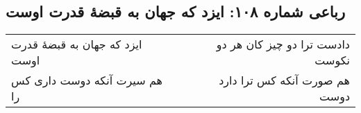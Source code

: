 \begin{center}
\section*{رباعی شماره ۱۰۸: ایزد که جهان به قبضهٔ قدرت اوست}
\label{sec:sh108}
\begin{longtable}{l p{0.5cm} r}
ایزد که جهان به قبضهٔ قدرت اوست
&&
دادست ترا دو چیز کان هر دو نکوست
\\
هم سیرت آنکه دوست داری کس را
&&
هم صورت آنکه کس ترا دارد دوست
\\
\end{longtable}
\end{center}
